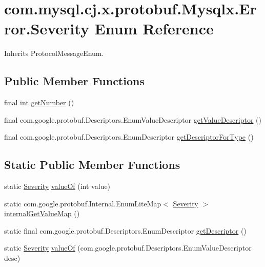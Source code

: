 \hypertarget{enumcom_1_1mysql_1_1cj_1_1x_1_1protobuf_1_1_mysqlx_1_1_error_1_1_severity}{}\section{com.\+mysql.\+cj.\+x.\+protobuf.\+Mysqlx.\+Error.\+Severity Enum Reference}
\label{enumcom_1_1mysql_1_1cj_1_1x_1_1protobuf_1_1_mysqlx_1_1_error_1_1_severity}


Inherits Protocol\+Message\+Enum.

\subsection*{Public Member Functions}
\begin{DoxyCompactItemize}
\item 
final int \mbox{\hyperlink{enumcom_1_1mysql_1_1cj_1_1x_1_1protobuf_1_1_mysqlx_1_1_error_1_1_severity_a0079b7f56a5d09d487ad060c3286ab1a}{get\+Number}} ()
\item 
final com.\+google.\+protobuf.\+Descriptors.\+Enum\+Value\+Descriptor \mbox{\hyperlink{enumcom_1_1mysql_1_1cj_1_1x_1_1protobuf_1_1_mysqlx_1_1_error_1_1_severity_a5377cc3a4df307669fb76be2d461c04b}{get\+Value\+Descriptor}} ()
\item 
final com.\+google.\+protobuf.\+Descriptors.\+Enum\+Descriptor \mbox{\hyperlink{enumcom_1_1mysql_1_1cj_1_1x_1_1protobuf_1_1_mysqlx_1_1_error_1_1_severity_ab8bb6219b499f95b85345b5effcdb903}{get\+Descriptor\+For\+Type}} ()
\end{DoxyCompactItemize}
\subsection*{Static Public Member Functions}
\begin{DoxyCompactItemize}
\item 
static \mbox{\hyperlink{enumcom_1_1mysql_1_1cj_1_1x_1_1protobuf_1_1_mysqlx_1_1_error_1_1_severity}{Severity}} \mbox{\hyperlink{enumcom_1_1mysql_1_1cj_1_1x_1_1protobuf_1_1_mysqlx_1_1_error_1_1_severity_a1daeaa1ff1049d808780fcfdfad53342}{value\+Of}} (int value)
\item 
static com.\+google.\+protobuf.\+Internal.\+Enum\+Lite\+Map$<$ \mbox{\hyperlink{enumcom_1_1mysql_1_1cj_1_1x_1_1protobuf_1_1_mysqlx_1_1_error_1_1_severity}{Severity}} $>$ \mbox{\hyperlink{enumcom_1_1mysql_1_1cj_1_1x_1_1protobuf_1_1_mysqlx_1_1_error_1_1_severity_ac0fee37ff34068f9f9136e35feaab632}{internal\+Get\+Value\+Map}} ()
\item 
static final com.\+google.\+protobuf.\+Descriptors.\+Enum\+Descriptor \mbox{\hyperlink{enumcom_1_1mysql_1_1cj_1_1x_1_1protobuf_1_1_mysqlx_1_1_error_1_1_severity_adbaebbd562c962c4799803037fbb488b}{get\+Descriptor}} ()
\item 
static \mbox{\hyperlink{enumcom_1_1mysql_1_1cj_1_1x_1_1protobuf_1_1_mysqlx_1_1_error_1_1_severity}{Severity}} \mbox{\hyperlink{enumcom_1_1mysql_1_1cj_1_1x_1_1protobuf_1_1_mysqlx_1_1_error_1_1_severity_a5c28b19e307791bd1abeaf7b2b4f506d}{value\+Of}} (com.\+google.\+protobuf.\+Descriptors.\+Enum\+Value\+Descriptor desc)
\end{DoxyCompactItemize}
